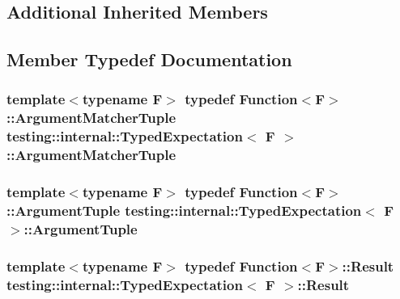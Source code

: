 \subsection*{Additional Inherited Members}


\subsection{Member Typedef Documentation}
\subsubsection[{\texorpdfstring{Argument\+Matcher\+Tuple}{ArgumentMatcherTuple}}]{\setlength{\rightskip}{0pt plus 5cm}template$<$typename F$>$ typedef {\bf Function}$<$F$>$\+::{\bf Argument\+Matcher\+Tuple} {\bf testing\+::internal\+::\+Typed\+Expectation}$<$ F $>$\+::{\bf Argument\+Matcher\+Tuple}}\hypertarget{classtesting_1_1internal_1_1TypedExpectation_a8f10e3906761cc5c10fa3561c6e8938e}{}\label{classtesting_1_1internal_1_1TypedExpectation_a8f10e3906761cc5c10fa3561c6e8938e}
\subsubsection[{\texorpdfstring{Argument\+Tuple}{ArgumentTuple}}]{\setlength{\rightskip}{0pt plus 5cm}template$<$typename F$>$ typedef {\bf Function}$<$F$>$\+::{\bf Argument\+Tuple} {\bf testing\+::internal\+::\+Typed\+Expectation}$<$ F $>$\+::{\bf Argument\+Tuple}}\hypertarget{classtesting_1_1internal_1_1TypedExpectation_a9a91379262d101f435809ba4556d14fa}{}\label{classtesting_1_1internal_1_1TypedExpectation_a9a91379262d101f435809ba4556d14fa}
\subsubsection[{\texorpdfstring{Result}{Result}}]{\setlength{\rightskip}{0pt plus 5cm}template$<$typename F$>$ typedef {\bf Function}$<$F$>$\+::{\bf Result} {\bf testing\+::internal\+::\+Typed\+Expectation}$<$ F $>$\+::{\bf Result}}\hypertarget{classtesting_1_1internal_1_1TypedExpectation_a6503597ee9d5ec940bfe8e51832b2422}{}\label{classtesting_1_1internal_1_1TypedExpectation_a6503597ee9d5ec940bfe8e51832b2422}


